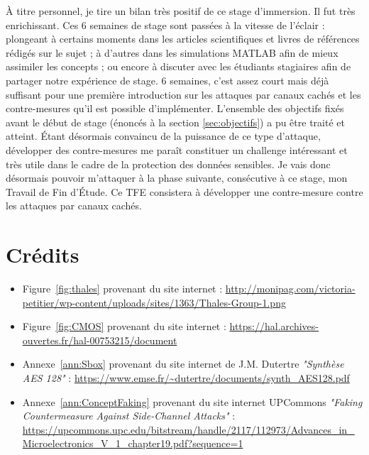 \documentclass[oneside]{book}
\begin{document}
À titre personnel, je tire un bilan très positif de ce stage d'immersion. Il fut très enrichissant. Ces 6 semaines de stage sont passées à la vitesse de l'éclair : plongeant à certains moments dans les articles scientifiques et livres de références rédigés sur le sujet ; à d'autres dans les simulations MATLAB afin de mieux assimiler les concepts ; ou encore à discuter avec les étudiants stagiaires afin de partager notre expérience de stage. 6 semaines, c'est assez court mais déjà suffisant pour une première introduction sur les attaques par canaux cachés et les contre-mesures qu'il est possible d'implémenter. L'ensemble des objectifs fixés avant le début de stage (énoncés à la section \ref{sec:objectifs}) a pu être traité et atteint. Étant désormais convaincu de la puissance de ce type d'attaque, développer des contre-mesures me paraît constituer un challenge intéressant et très utile dans le cadre de la protection des données sensibles. Je vais donc désormais pouvoir m'attaquer à la phase suivante, consécutive à ce stage, mon Travail de Fin d'Étude. Ce TFE consistera à développer une contre-mesure contre les attaques par canaux cachés.




\newpage
\section*{Crédits}

\begin{itemize}

\item Figure~\ref{fig:thales} provenant du site internet :
\url{http://monipag.com/victoria-petitier/wp-content/uploads/sites/1363/Thales-Group-1.png}

\item Figure~\ref{fig:CMOS} provenant du site internet :
\url{https://hal.archives-ouvertes.fr/hal-00753215/document}

\item Annexe~\ref{ann:Sbox} provenant du site internet de J.M. Dutertre \textit{"Synthèse AES 128"} :
\url{https://www.emse.fr/~dutertre/documents/synth_AES128.pdf}

\item Annexe~\ref{ann:ConceptFaking} provenant du site internet UPCommons \textit{"Faking Countermeasure Against Side-Channel Attacks"} :
\url{https://upcommons.upc.edu/bitstream/handle/2117/112973/Advances_in_Microelectronics_V_1_chapter19.pdf?sequence=1}

\end{itemize}
\end{document}
